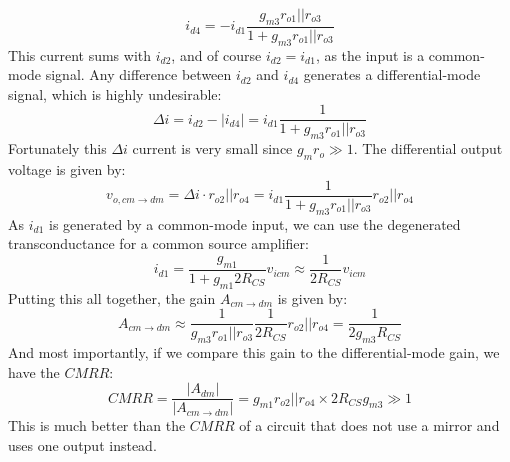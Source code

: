     \begin{equation}
        i_{d4} =  -i_{d1}  \frac{g_{m3} r_{o1} || r_{o3}}{1 + g_{m3} r_{o1} || r_{o3}}
    \end{equation}
This current sums with $i_{d2}$, and of course $i_{d2} = i_{d1}$, as the input is a common-mode signal. Any difference between $i_{d2}$ and $i_{d4}$ generates a differential-mode signal, which is highly undesirable:
    \begin{equation}
        \Delta i = i_{d2} - | i_{d4} | = i_{d1}  \frac{1}{1 + g_{m3} r_{o1} || r_{o3}}
    \end{equation}
Fortunately this $\Delta i$ current is very small since $g_m r_o \gg 1$.  The differential output voltage is given by:
    \begin{equation}
        v_{o,cm\to dm} = \Delta i \cdot r_{o2}||r_{o4} = i_{d1}  \frac{1}{1 + g_{m3} r_{o1} || r_{o3}} r_{o2}||r_{o4}
    \end{equation}
As $i_{d1}$ is generated by a common-mode input, we can use the degenerated transconductance for a common source amplifier:
    \begin{equation}
        i_{d1} = \frac{g_{m1}}{1 + g_{m1} 2 R_{CS}} v_{icm} \approx \frac{1}{2 R_{CS}} v_{icm}
    \end{equation}
Putting this all together, the gain $A_{cm \to dm}$ is given by:
    \begin{equation}
        {A_{cm \to dm }} \approx  \frac{1}{g_{m3} r_{o1} || r_{o3}} \frac{1}{2 R_{CS}}  r_{o2}||r_{o4} = \frac{1}{2 g_{m3} R_{CS}} 
    \end{equation}
And most importantly, if we compare this gain to the differential-mode gain, we have the $CMRR$:
    \begin{equation}
        CMRR = \frac{{\left| {{A_{dm}}} \right|}}{{\left| {{A_{cm \to dm}}} \right|}} = {g_{m1}} r_{o2} || r_{o4} \times 2 R_{CS} g_{m3} \gg 1
    \end{equation}
This is much better than the $CMRR$ of a circuit that does not use a mirror and uses one output instead.
